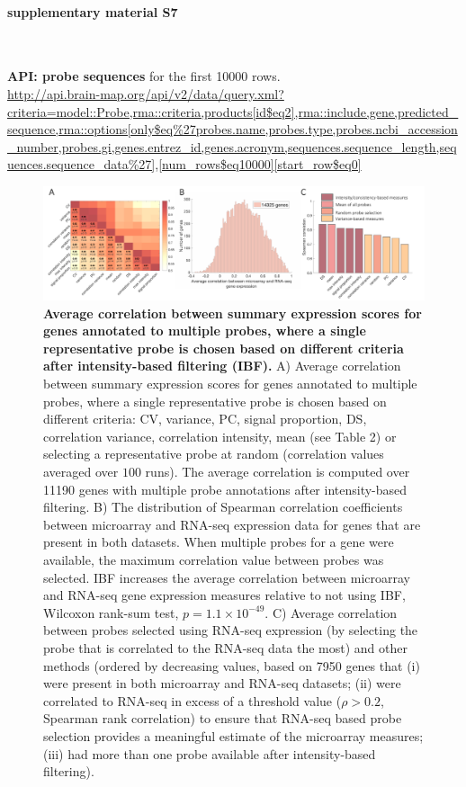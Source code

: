 \documentclass[10pt,A4]{article}
\begin{document}
\paragraph*{supplementary material S7}\mbox{}\\
\label{SItext7}

\textbf{API: probe sequences} for the first \num{10000} rows.\\
\url{http://api.brain-map.org/api/v2/data/query.xml?criteria=model::Probe,rma::criteria,products[id$eq2],rma::include,gene,predicted_sequence,rma::options[only$eq%27probes.name,probes.type,probes.ncbi_accession_number,probes.gi,genes.entrez_id,genes.acronym,sequences.sequence_length,sequences.sequence_data%27],[num_rows$eq10000][start_row$eq0]}

\newpage

\begin{figure}[h!]
  \centering
    \includegraphics[width=1\textwidth]{FigureS1.pdf}
\caption{\textbf{Average correlation between summary expression scores for genes annotated to multiple probes, where a single representative probe is chosen based on different criteria after intensity-based filtering (IBF).}
A) Average correlation between summary expression scores for genes annotated to multiple probes, where a single representative probe is chosen based on different criteria: CV, variance, PC, signal proportion, DS, correlation variance, correlation intensity, mean (see Table 2) or selecting a representative probe at random (correlation values averaged over $100$ runs). The average correlation is computed over \num{11190} genes with multiple probe annotations after intensity-based filtering. B) The distribution of Spearman correlation coefficients between microarray and RNA-seq expression data for genes that are present in both datasets. When multiple probes for a gene were available, the maximum correlation value between probes was selected. IBF increases the average correlation between microarray and RNA-seq gene expression measures relative to not using IBF, Wilcoxon rank-sum test, $p=1.1 \times 10^{-49}$. C) Average correlation between probes selected using RNA-seq expression (by selecting the probe that is correlated to the RNA-seq data the most) and other methods (ordered by decreasing values, based on \num{7950} genes that (i) were present in both microarray and RNA-seq datasets; (ii) were correlated to RNA-seq in excess of a threshold value ($\rho > 0.2$, Spearman rank correlation) to ensure that RNA-seq based probe selection provides a meaningful estimate of the microarray measures; (iii) had more than one probe available after intensity-based filtering). }
\label{FigS1}
\end{figure}
\end{document}
